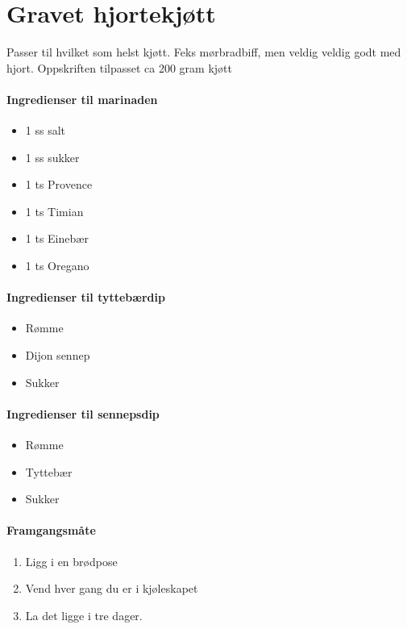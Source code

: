 \section{﻿Gravet hjortekjøtt}
Passer til hvilket som helst kjøtt. Feks mørbradbiff, men veldig veldig godt med hjort.
Oppskriften tilpasset ca 200 gram kjøtt

\paragraph{Ingredienser til marinaden}
\begin{itemize}[noitemsep]
	\item 1 ss salt
	\item 1 ss sukker
	\item 1 ts Provence
	\item 1 ts Timian
	\item 1 ts Einebær
	\item 1 ts Oregano
\end{itemize}

\paragraph{Ingredienser til tyttebærdip}
\begin{itemize}[noitemsep]
	\item Rømme
	\item Dijon sennep
	\item Sukker
\end{itemize}

\paragraph{Ingredienser til sennepsdip}
\begin{itemize}[noitemsep]
	\item Rømme
	\item Tyttebær
	\item Sukker
\end{itemize}

\paragraph{Framgangsmåte}
\begin{enumerate}[noitemsep]
	\item Ligg i en brødpose
	\item Vend hver gang du er i kjøleskapet
	\item La det ligge i tre dager.
\end{enumerate}
